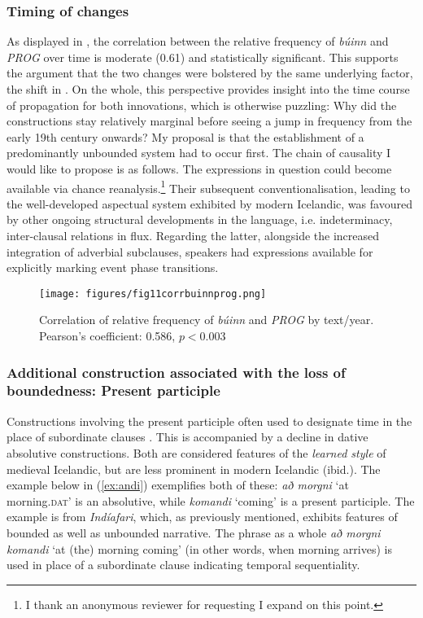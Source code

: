 \documentclass[output=paper,colorlinks,citecolor=brown]{langscibook}
\begin{document}
\subsubsection{Timing of changes}\label{sec:Chark5.2.5}

As displayed in , the correlation between the relative frequency of \textit{búinn} and \textit{PROG} over time is moderate (0.61) and statistically significant. This supports the argument that the two changes were bolstered by the same underlying factor, the shift in . On the whole, this perspective provides insight into the time course of propagation for both innovations, which is otherwise puzzling: Why did the constructions stay relatively marginal before seeing a jump in frequency from the early 19th century onwards? My proposal is that the establishment of a predominantly unbounded system had to occur first. The chain of causality I would like to propose is as follows. The expressions in question could become available via chance reanalysis.\footnote{I thank an anonymous reviewer for requesting I expand on this point.} Their subsequent conventionalisation, leading to the well-developed aspectual system exhibited by modern Icelandic, was favoured by other ongoing structural developments in the language, i.e.  indeterminacy, inter-clausal relations in flux. Regarding the latter, alongside the increased integration of adverbial subclauses, speakers had expressions available for explicitly marking event phase transitions.


 \begin{figure}
    \centering
    \texttt{[image: figures/fig11corrbuinnprog.png]}
    \caption{Correlation of relative frequency of \textit{búinn} and \textit{PROG} by text/year. Pearson's coefficient: 0.586, $p < 0.003$
}\label{fig:corrprogb}
\end{figure}

\subsubsection{Additional construction associated with the loss of boundedness: Present participle}\label{sec:Chark5.2.6}

Constructions involving the present participle often used to designate time in the place of subordinate clauses \citep{hauksson1994islensk}. This is accompanied by a decline in dative absolutive constructions. Both are considered features of the \textit{learned style} of medieval Icelandic, but are less prominent in modern Icelandic  (ibid.). The example below in (\ref{ex:andi}) exemplifies both of these: \textit{að morgni} `at morning.\textsc{dat}' is an absolutive, while \textit{komandi} `coming' is a present participle. The example is from \textit{Indíafari}, which, as previously mentioned, exhibits features of bounded as well as unbounded narrative. The phrase as a whole \textit{að morgni komandi} `at (the) morning coming' (in other words, when morning arrives) is used in place of a subordinate clause indicating temporal sequentiality.
\end{document}
